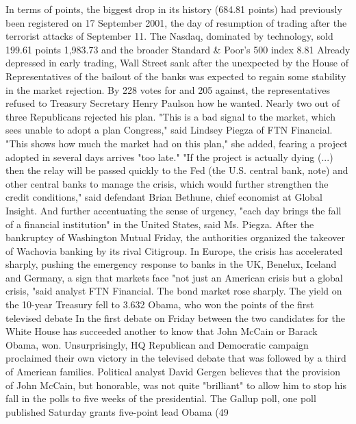 In terms of points, the biggest drop in its history (684.81 points) had previously been registered on 17 September 2001, the day of resumption of trading after the terrorist attacks of September 11.
The Nasdaq, dominated by technology, sold 199.61 points 1,983.73 and the broader Standard & Poor's 500 index 8.81%
Already depressed in early trading, Wall Street sank after the unexpected by the House of Representatives of the bailout of the banks was expected to regain some stability in the market rejection.
By 228 votes for and 205 against, the representatives refused to Treasury Secretary Henry Paulson how he wanted.
Nearly two out of three Republicans rejected his plan.
"This is a bad signal to the market, which sees unable to adopt a plan Congress," said Lindsey Piegza of FTN Financial.
"This shows how much the market had on this plan," she added, fearing a project adopted in several days arrives "too late."
"If the project is actually dying (...) then the relay will be passed quickly to the Fed (the U.S. central bank, note) and other central banks to manage the crisis, which would further strengthen the credit conditions," said defendant Brian Bethune, chief economist at Global Insight.
And further accentuating the sense of urgency, "each day brings the fall of a financial institution" in the United States, said Ms. Piegza.
After the bankruptcy of Washington Mutual Friday, the authorities organized the takeover of Wachovia banking by its rival Citigroup.
In Europe, the crisis has accelerated sharply, pushing the emergency response to banks in the UK, Benelux, Iceland and Germany, a sign that markets face "not just an American crisis but a global crisis, "said analyst FTN Financial.
The bond market rose sharply.
The yield on the 10-year Treasury fell to 3.632%
Obama, who won the points of the first televised debate
In the first debate on Friday between the two candidates for the White House has succeeded another to know that John McCain or Barack Obama, won.
Unsurprisingly, HQ Republican and Democratic campaign proclaimed their own victory in the televised debate that was followed by a third of American families.
Political analyst David Gergen believes that the provision of John McCain, but honorable, was not quite "brilliant" to allow him to stop his fall in the polls to five weeks of the presidential.
The Gallup poll, one poll published Saturday grants five-point lead Obama (49%
